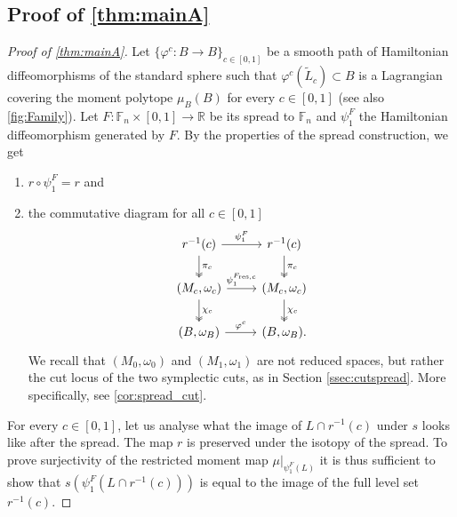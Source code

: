 \documentclass[10pt,oneside,reqno]{amsart}
\theoremstyle{definition}
\newcommand{\FF}{\mathbb{F}}
\newcommand{\R}{\mathbb{R}}
\newcommand{\resc}{{\textup{res},c}}
\begin{document}
\subsection{Proof of \cref{thm:mainA}}
\begin{proof}[Proof of \cref{thm:mainA}]
    Let $\{\varphi^c:B \to B\}_{c\in [0,1]}$ be a smooth path of Hamiltonian diffeomorphisms of the standard sphere such that $\varphi^c(\tilde{L}_c)\subset B$ is a Lagrangian covering the moment polytope $\mu_B(B)$ for every $c \in [0,1]$ (see also \cref{fig:Family}). Let $F:\FF_n\times [0,1] \rightarrow \R$ be its spread to $\FF_n$ and $\psi^F_1$ the Hamiltonian diffeomorphism generated by $F$. By the properties of the spread construction, we get
    \begin{enumerate}
        \item $r \circ \psi^F_1 =r$ and
        \item the commutative diagram for all $c \in [0,1]$
        \begin{equation} \label{eq:centralladder}
            \begin{tikzcd}
        r^{-1}(c) \arrow[r, "\psi^F_1"] \arrow[d, "\pi_c", two heads]      & r^{-1}(c)  \arrow[d, "\pi_c", two heads]            \\
        {(M_c,\omega_c)} \arrow[r, "\psi^{F_\resc}_1"] \arrow[d, "\chi_c",two heads] & {(M_c,\omega_c)} \arrow[d, "\chi_c", two heads]  \\
        {(B,\omega_B)} \arrow[r, "\varphi^c"]                              & {(B,\omega_B)}.                                                        
    \end{tikzcd}
        \end{equation}
         We recall that $(M_0,\omega_0)$ and $(M_1,\omega_1)$ are not reduced spaces, but rather the cut locus of the two symplectic cuts, as in Section \ref{ssec:cutspread}. More specifically, see \cref{cor:spread_cut}.
    \end{enumerate}

For every $c \in [0,1]$, let us analyse what the image of $L \cap r^{-1}(c)$ under $s$ looks like after the spread. The map $r$ is preserved under the isotopy of the spread. To prove surjectivity of the restricted moment map $\mu\vert_{\psi_1^F(L)}$ it is thus sufficient to show that $s(\psi^F_1(L \cap r^{-1}(c)))$ is equal to the image of the full level set $r^{-1}(c)$. 


\end{proof}
\end{document}
